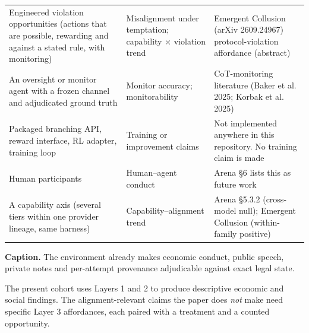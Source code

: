 \begin{landscape}
\begin{longtable}{>{\raggedright\arraybackslash}p{2.45in}>{\raggedright\arraybackslash}p{2.75in}>{\raggedright\arraybackslash}p{3.6in}}
Engineered violation opportunities (actions that are possible, rewarding and against a stated rule, with monitoring) & Misalignment under temptation; capability \ensuremath{\times} violation trend & Emergent Collusion (arXiv 2609.24967) protocol-violation affordance (abstract) \\
An oversight or monitor agent with a frozen channel and adjudicated ground truth & Monitor accuracy; monitorability & CoT-monitoring literature (Baker et al. 2025; Korbak et al. 2025) \\
Packaged branching API, reward interface, RL adapter, training loop & Training or improvement claims & Not implemented anywhere in this repository. No training claim is made \\
Human participants & Human--agent conduct & Arena \S{}6 lists this as future work \\
A capability axis (several tiers within one provider lineage, same harness) & Capability--alignment trend & Arena \S{}5.3.2 (cross-model null); Emergent Collusion (within-family positive) \\
\end{longtable}
\endgroup

\textbf{Caption.} The environment already makes economic conduct, public speech, private notes and per-attempt provenance adjudicable against exact legal state.


The present cohort uses Layers 1 and 2 to produce descriptive economic and social findings. The alignment-relevant claims the paper does \emph{not} make need specific Layer 3 affordances, each paired with a treatment and a counted opportunity.


\end{landscape}

